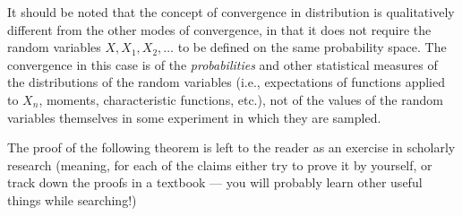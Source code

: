 \noindent It should be noted that the concept of convergence in
distribution is qualitatively different from the other
modes of convergence, in that it does not require the
random variables $X, X_1, X_2, \ldots$ to be defined
on the same probability space. The convergence in this
case is of the \emph{probabilities} and other statistical
measures of the distributions of the random variables
(i.e., expectations of functions applied to $X_n$,
moments, characteristic functions, etc.), not of the
values of the random variables themselves in some
experiment in which they are sampled.

The proof of the following theorem is left to the
reader as an exercise in scholarly research (meaning,
for each of the claims either try to prove it by
yourself, or track down the proofs in a textbook ---
you will probably learn other useful things while
searching!)

